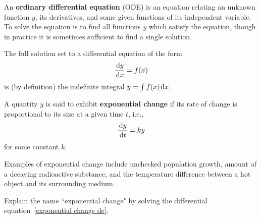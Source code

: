 \setcounter{chapter}{7}
\setcounter{section}{4}
\setcounter{theorem}{0}
\setcounter{equation}{0}


\begin{definition}
An \textbf{ordinary differential equation} (ODE) is an equation relating an unknown function $y$, its derivatives, and some given functions of its independent variable.
To solve the equation is to find all functions $y$ which satisfy the equation, though in practice it is sometimes sufficient to find a single solution.
\end{definition}

\begin{remark}
The full solution set to a differential equation of the form
\begin{equation*}
\frac{\mkern 2mu \mathrm{d} y}{\mkern 2mu \mathrm{d} x} = f(x)
\end{equation*}
is (by definition) the indefinite integral $y = \int f(x)\mkern 2mu \mathrm{d} x$.
\end{remark}

\begin{definition}
A quantity $y$ is said to exhibit \textbf{exponential change} if its rate of change is proportional to its size at a given time $t$, i.e., 
\begin{equation}\label{exponential change de}
\frac{\mkern 2mu \mathrm{d} y}{\mkern 2mu \mathrm{d} t} = ky
\end{equation}
for some constant $k$.
\end{definition}

\begin{remark}
Examples of exponential change include unchecked population growth, amount of a decaying radioactive substance, and the temperature difference between a hot object and its surrounding medium.
\end{remark}

\begin{example}
Explain the name ``exponential change" by solving the differential equation~\eqref{exponential change de}.
\end{example}

